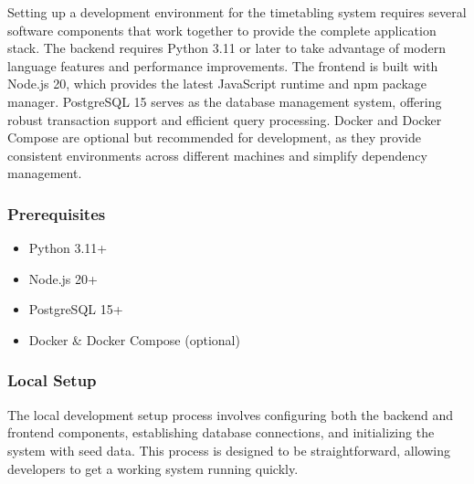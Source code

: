 \documentclass[12pt,a4paper]{article}
\begin{document}
Setting up a development environment for the timetabling system requires several software components that work together to provide the complete application stack. The backend requires Python 3.11 or later to take advantage of modern language features and performance improvements. The frontend is built with Node.js 20, which provides the latest JavaScript runtime and npm package manager. PostgreSQL 15 serves as the database management system, offering robust transaction support and efficient query processing. Docker and Docker Compose are optional but recommended for development, as they provide consistent environments across different machines and simplify dependency management.

\subsubsection{Prerequisites}
\begin{itemize}
    \item Python 3.11+
    \item Node.js 20+
    \item PostgreSQL 15+
    \item Docker \& Docker Compose (optional)
\end{itemize}

\subsubsection{Local Setup}

The local development setup process involves configuring both the backend and frontend components, establishing database connections, and initializing the system with seed data. This process is designed to be straightforward, allowing developers to get a working system running quickly.
\end{document}

